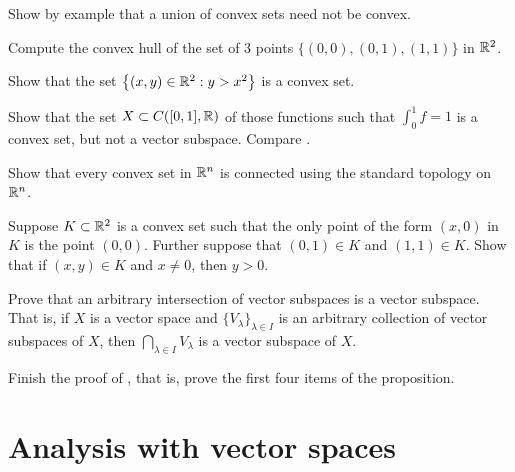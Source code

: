 \begin{exercise}[Easy]
Show by example that a union of convex sets need not be convex.
\end{exercise}

\begin{exercise}
Compute the convex hull of the set of 3 points
$\bigl\{ (0,0), (0,1), (1,1) \bigr\}$
in ${\mathbb{R}}^2$.
\end{exercise}

\begin{exercise}
Show that the set $\bigl\{ (x,y) \in {\mathbb{R}}^2 : y > x^2 \bigr\}$ is a convex set.
\end{exercise}

\begin{exercise} \label{exercise:intoneconvex}
Show that the set $X \subset C([0,1],{\mathbb{R}})$ of those functions such 
that $\int_0^1 f = 1$ is a convex set, but not a vector subspace.
Compare .
\end{exercise}


\begin{exercise}
Show that every convex set in ${\mathbb{R}}^n$ is connected using the standard
topology on ${\mathbb{R}}^n$.
\end{exercise}

\begin{exercise}
Suppose $K \subset {\mathbb{R}}^2$ is a convex set such that the only point of
the form $(x,0)$ in $K$ is the point $(0,0)$.  Further suppose that
$(0,1) \in K$ and $(1,1) \in K$.  Show that if $(x,y) \in K$ and $x
\not= 0$, then $y > 0$.
\end{exercise}

\begin{exercise}
Prove that an arbitrary intersection of vector subspaces
is a vector subspace.
That is, if $X$ is a vector space and
$\{ V_\lambda \}_{\lambda \in I}$ is
an arbitrary collection of vector subspaces of $X$,
then
$\bigcap_{\lambda \in I} V_\lambda$ is a vector subspace of $X$.
\end{exercise}

\begin{exercise}[Easy] \label{exercise:LXYvs}
Finish the proof of , that is, prove the first four
items of the proposition.
\end{exercise}


\sectionnewpage
\section{Analysis with vector spaces}
\label{sec:normsmatsdets}

